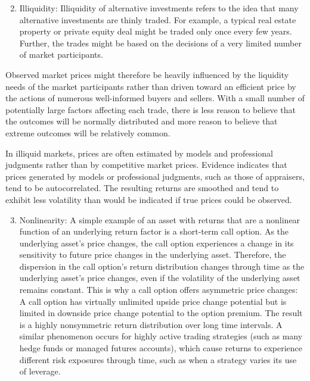 \documentclass[11pt]{article}
\begin{document}
\begin{enumerate}
  \setcounter{enumi}{1}
  \item Illiquidity: Illiquidity of alternative investments refers to the idea that many alternative investments are thinly traded. For example, a typical real estate property or private equity deal might be traded only once every few years. Further, the trades might be based on the decisions of a very limited number of market participants.
\end{enumerate}

Observed market prices might therefore be heavily influenced by the liquidity needs of the market participants rather than driven toward an efficient price by the actions of numerous well-informed buyers and sellers. With a small number of potentially large factors affecting each trade, there is less reason to believe that the outcomes will be normally distributed and more reason to believe that extreme outcomes will be relatively common.

In illiquid markets, prices are often estimated by models and professional judgments rather than by competitive market prices. Evidence indicates that prices generated by models or professional judgments, such as those of appraisers, tend to be autocorrelated. The resulting returns are smoothed and tend to exhibit less volatility than would be indicated if true prices could be observed.

\begin{enumerate}
  \setcounter{enumi}{2}
  \item Nonlinearity: A simple example of an asset with returns that are a nonlinear function of an underlying return factor is a short-term call option. As the underlying asset's price changes, the call option experiences a change in its sensitivity to future price changes in the underlying asset. Therefore, the dispersion in the call option's return distribution changes through time as the underlying asset's price changes, even if the volatility of the underlying asset remains constant. This is why a call option offers asymmetric price changes: A call option has virtually unlimited upside price change potential but is limited in downside price change potential to the option premium. The result is a highly nonsymmetric return distribution over long time intervals. A similar phenomenon occurs for highly active trading strategies (such as many hedge funds or managed futures accounts), which cause returns to experience different risk exposures through time, such as when a strategy varies its use of leverage.
\end{enumerate}
\end{document}
